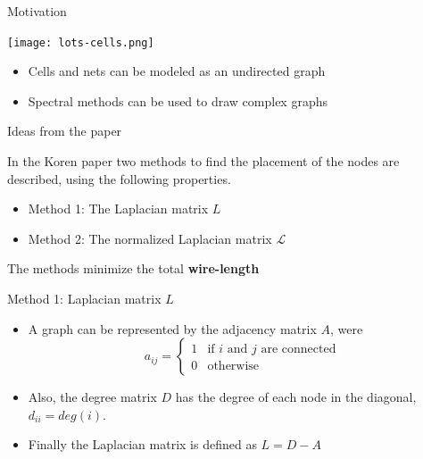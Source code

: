 \documentclass[serif, 12pt]{beamer}
\begin{document}
\begin{frame}{Motivation}

\begin{center}
\texttt{[image: lots-cells.png]}
\end{center}

\begin{itemize}
\item Cells and nets can be modeled as an undirected graph
\item Spectral methods can be used to draw complex graphs
\end{itemize}

\end{frame}

\begin{frame}{Ideas from the paper}

In the Koren paper \cite{koren} two methods to find the placement of the nodes 
are described, using the following properties.

\begin{itemize}
\item Method 1: The Laplacian matrix $L$
\item Method 2: The normalized Laplacian matrix $\mathcal L$
\end{itemize}

The methods minimize the total \textbf{wire-length}

\end{frame}

\begin{frame}{Method 1: Laplacian matrix $L$}

\begin{itemize}
\item A graph can be represented by the adjacency matrix $A$, were
$$ a_{ij} =
\begin{cases}
	1 & \text{if $i$ and $j$ are connected} \\
	0 & \text{otherwise}
\end{cases}
$$
\item Also, the degree matrix $D$ has the degree of each node in the diagonal, 
$d_{ii} = deg(i)$.

\item Finally the Laplacian matrix is defined as $L = D - A$
\end{itemize}

\end{frame}
\end{document}
